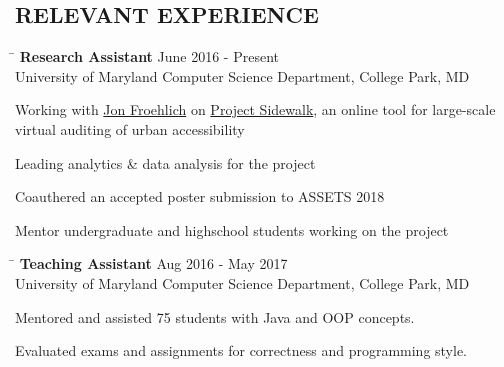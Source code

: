 \documentclass{res}
\begin{document}
\begin{resume}
{  \section{\hspace{0.3in}RELEVANT EXPERIENCE}
    \vspace{-3pt}
    \begin{tabbing}
      \hspace{5.65in}\=  \kill %
      {\bf Research Assistant}
      \>June 2016 - Present\\
      University of Maryland Computer Science Department, College Park, MD\\     
    \end{tabbing}
    \vspace{-24pt}      %
    \begin{list}{\bf{-}}{}
      \setlength{\itemsep}{-2pt}
      \item Working with \href{http://www.cs.umd.edu/~jonf/}{Jon Froehlich} on
      \href{http://sidewalk.umiacs.umd.edu/}{Project Sidewalk}, an online tool for large-scale
      virtual auditing of urban accessibility
      \item Leading analytics \& data analysis for the project
      \item Coauthered an accepted poster submission to ASSETS 2018
      \item Mentor undergraduate and highschool students working on the project
    \end{list}

    \vspace{-12pt}
    \begin{tabbing}
      \hspace{5.65in}\=  \kill %
      {\bf Teaching Assistant}
      \>Aug 2016 - May 2017\\
      University of Maryland Computer Science Department, College Park, MD\\     
    \end{tabbing}
    \vspace{-24pt}      %
    \begin{list}{\bf{-}}{}
      \setlength{\itemsep}{-2pt}
      \item Mentored and assisted 75 students with Java and OOP concepts.
      \item Evaluated exams and assignments for correctness and programming style.
    \end{list}
    
}
\end{resume}
\end{document}
